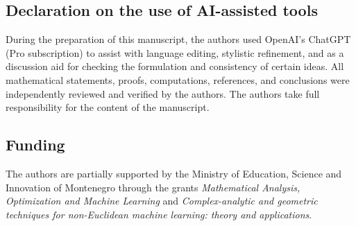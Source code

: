 \documentclass[11pt]{article}
\theoremstyle{definition}
\theoremstyle{remark}
\theoremstyle{definition}
\begin{document}
\subsection*{Declaration on the use of AI-assisted tools}
During the preparation of this manuscript, the authors used OpenAI's ChatGPT
(Pro subscription) to assist with language editing, stylistic refinement, and
as a discussion aid for checking the formulation and consistency of certain
ideas. All mathematical statements, proofs, computations, references, and
conclusions were independently reviewed and verified by the authors. The
authors take full responsibility for the content of the manuscript.

\subsection*{Funding}
The authors are partially supported by the Ministry of Education, Science and Innovation of Montenegro through the grants \emph{Mathematical Analysis, Optimization and Machine Learning} and \emph{Complex-analytic and geometric techniques for non-Euclidean machine learning: theory and applications}.
\end{document}
